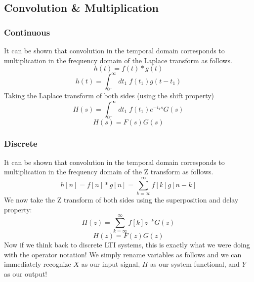 \documentclass[a4paper]{article}
\numberwithin{equation}{section}
\begin{document}
\subsection{Convolution \& Multiplication}
\subsubsection{Continuous}
It can be shown that convolution in the temporal domain corresponds to multiplication in the frequency domain of the Laplace transform as follows.
\begin{equation}
h(t) =  f(t)*g(t)
\end{equation}
\begin{equation}
h(t) =  \int_{0^-}^{\infty}dt_1\; f(t_1) g(t-t_1)
\end{equation}
Taking the Laplace transform of both sides (using the shift property)
\begin{equation}
H(s) =  \int_{0^-}^{\infty}dt_1\; f(t_1) e^{-t_1s}G(s)
\end{equation}
\begin{equation}
H(s) =  F(s)G(s)
\end{equation}



\subsubsection{Discrete}
It can be shown that convolution in the temporal domain corresponds to multiplication in the frequency domain of the Z transform as follows.  
\begin{equation}
h[n]=f[n]*g[n] = \sum_{k=\infty}^{\infty}f[k]g[n-k]
\end{equation}
We now take the Z transform of both sides using the superposition and delay property:
\begin{equation}
H(z)=\sum_{k=\infty}^{\infty}f[k]z^{-k}G(z)
\end{equation}
\begin{equation}
H(z)=F(z)G(z)
\end{equation}
Now if we think back to discrete LTI systems, this is exactly what we were doing with the operator notation! We simply rename variables as follows and we can immediately recognize $X$ as our input signal, $H$ as our system functional, and $Y$ as our output!

\begin{center}
\end{center}
\end{document}
